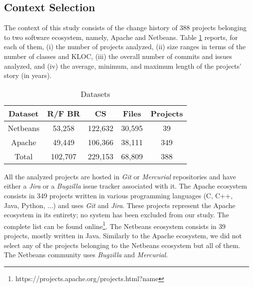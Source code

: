 
\subsection{Context Selection}

The context of this study consists of the change history of 388 projects belonging to two software ecosystem, namely, Apache and Netbeans.
Table \ref{table:datasets} reports, for each of them, (i) the number of projects analyzed, (ii) size ranges in terms of the number of classes and KLOC, (iii) the overall number of commits and issues analyzed, and (iv) the average, minimum, and maximum length of the projects' story (in years).

\begin{table}[h]
\begin{center}
\begin{tabular}{@{}c|c|c|c|c@{}}
\textbf{Dataset} & \textbf{R/F BR} & \textbf{CS} & \textbf{Files} & \textbf{Projects} \\ \hline \hline
Netbeans         & 53,258          & 122,632     & 30,595         & 39                \\
Apache           & 49,449          & 106,366     & 38,111         & 349               \\
Total            & 102,707         & 229,153     & 68,809         & 388               \\ \hline \hline

\end{tabular}
\end{center}

\caption{Datasets\label{table:datasets}}
\end{table}



All the analyzed projects are hosted in {\it Git} or {\it Mercurial} repositories and have either a {\it Jira} or a {\it Bugzilla} issue tracker associated with it.
The Apache ecosystem consists in 349 projects written in various programming languages (C, C++, Java, Python, ...) and uses {\it Git} and {\it Jira}.
These projects represent the Apache ecosystem in its entirety; no system has been excluded from our study.
The complete list can be found online\footnote{https://projects.apache.org/projects.html?name}.
The Netbeans ecosystem consists in 39 projects, mostly written in Java.
Similarly to the Apache ecosystem, we did not select any of the projects belonging to the Netbeans ecosystem but all of them.
The Netbeans community uses {\it Bugzilla} and {\it Mercurial}.

